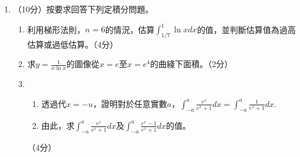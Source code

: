 \documentclass[12pt]{article}
\begin{document}
\begin{enumerate}
        \hrulefill
        \item （10分）按要求回答下列定積分問題。\begin{enumerate}
            \item 利用梯形法則，$n=6$的情況，估算$\displaystyle \int_{1/7}^1 \ln{x} dx$的值，並判斷估算值為過高估算或過低估算。\hfill（4分）
            \item 求$\displaystyle y=\frac{1}{x\ln{x}}$的圖像從$x=e$至$x=e^4$的曲綫下面積。\hfill（2分）
            \item \begin{enumerate}
                \item 透過代$x=-u$，證明對於任意實數$a$，$\displaystyle\int_{-a}^{a}\frac{e^{x}}{e^{x}+1}dx=\int_{-a}^{a}\frac{1}{e^{x}+1}dx$.
                \item 由此，求$\displaystyle\int_{-a}^{a}\frac{e^{x}}{e^{x}+1}dx$及$\displaystyle\int_{-a}^{a}\frac{e^{x}-1}{e^{x}+1}dx$的值。
            \end{enumerate}\hfill（4分）
        \end{enumerate}

        \hrulefill

        \hrulefill

        \hrulefill

        \hrulefill

        \hrulefill

        \hrulefill

        \hrulefill

        \hrulefill

        \hrulefill

        \hrulefill

        \hrulefill

        \hrulefill

        \hrulefill

        \hrulefill

        \hrulefill

        \hrulefill

        \hrulefill

        \hrulefill

        \hrulefill

        \hrulefill

        \hrulefill

        \hrulefill

        \hrulefill

        \hrulefill

        \hrulefill


\end{enumerate}
\end{document}
